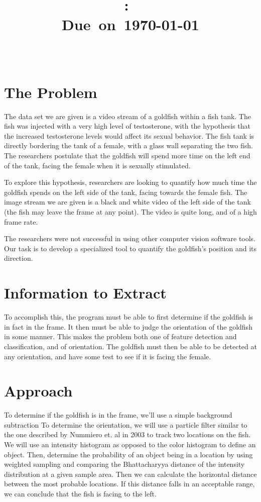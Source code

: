\documentclass[english]{report}
\title{\vspace{2in}\textmd{\textbf{\hmwkClass:\
\hmwkTitle}}\\\normalsize\vspace{0.1in}\small{Due\ on\
\today}\\\vspace{0.1in}\large{\textit{\classInstructor\ }}\vspace{3in}}
\date{}
\author{\textbf{\authorName}}
\begin{document}
\begin{spacing}{1.1}


\section{The Problem}

The data set we are given is a video stream of a goldfish within a fish
tank. The fish was injected with a very high level of testosterone, with
the hypothesis that the increased testosterone levels would affect its
sexual behavior. The fish tank is directly bordering the tank of a
female, with a glass wall separating the two fish. The researchers
postulate that the goldfish will spend more time on the left end of the
tank, facing the female when it is sexually stimulated.

To explore this hypothesis, researchers are looking to quantify how much
time the goldfish spends on the left side of the tank, facing towards
the female fish. The image stream we are given is a black and white
video of the left side of the tank (the fish may leave the frame at any
point). The video is quite long, and of a high frame rate.

The researchers were not successful in using other computer vision
software tools. Our task is to develop a specialized tool to quantify
the goldfish's position and its direction.

\section{Information to Extract}

To accomplish this, the program must be able to first determine if the
goldfish is in fact in the frame. It then must be able to judge the
orientation of the goldfish in some manner. This makes the problem both
one of feature detection and classification, and of orientation. The
goldfish must then be able to be detected at any orientation, and have
some test to see if it is facing the female.

\section{Approach}

To determine if the goldfish is in the frame, we'll use a simple
background subtraction  To determine the orientation, we will use a
particle filter similar to the one described by Nummiero et. al in 2003
to track two locations on the fish. We will use an intensity histogram
as opposed to the color histogram to define an object. Then, determine
the probability of an object being in a location by using weighted
sampling and comparing the Bhattacharyya distance of the intensity
distribution at a given sample area. Then we can calculate the
horizontal distance between the most probable locations. If this
distance falls in an acceptable range, we can conclude that the fish is
facing to the left.


\end{spacing}
\end{document}
